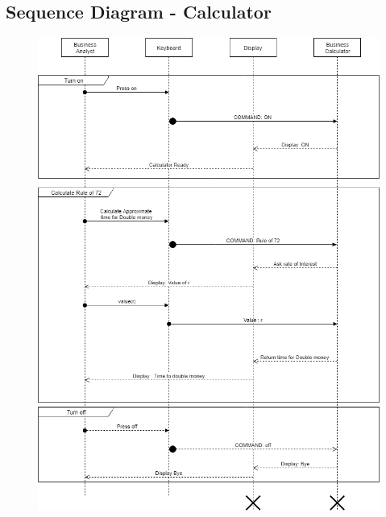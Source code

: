 \documentclass{article}
\begin{document}
\subsection{Sequence Diagram - Calculator}
\begin{figure}[h!]
    \centering
    \includegraphics[scale=0.55]{Problem5_Sequence.png}
\end{figure}
\newpage
\end{document}
